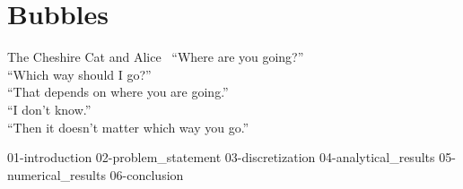 \chapter{\label{ch:bubbles}Bubbles}

\begin{frontquote}{The Cheshire Cat and Alice~\cite{wonderland}}
  ``Where are you going?'' \\
``Which way should I go?'' \\
``That depends on where you are going.'' \\
``I don’t know.'' \\
``Then it doesn’t matter which way you go.''\\
\end{frontquote}


{01-introduction}
{02-problem_statement}
{03-discretization}
{04-analytical_results}
{05-numerical_results}
{06-conclusion}
